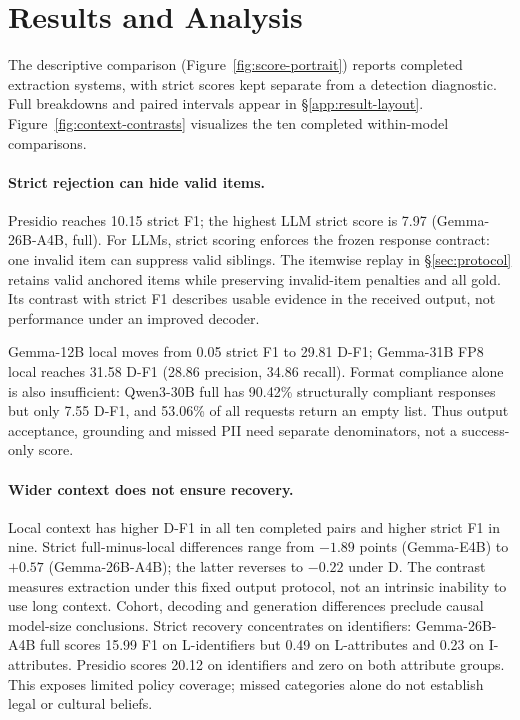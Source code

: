\section{Results and Analysis}
\label{sec:results}

The descriptive comparison (Figure~\ref{fig:score-portrait}) reports completed extraction systems, with strict scores kept separate from a detection diagnostic. Full breakdowns and paired intervals appear in \S\ref{app:result-layout}. Figure~\ref{fig:context-contrasts} visualizes the ten completed within-model comparisons.



\paragraph{Strict rejection can hide valid items.}
Presidio reaches 10.15 strict F1; the highest LLM strict score is 7.97 (Gemma-26B-A4B, full). For LLMs, strict scoring enforces the frozen response contract: one invalid item can suppress valid siblings. The itemwise replay in \S\ref{sec:protocol} retains valid anchored items while preserving invalid-item penalties and all gold. Its contrast with strict F1 describes usable evidence in the received output, not performance under an improved decoder.

Gemma-12B local moves from 0.05 strict F1 to 29.81 D-F1; Gemma-31B FP8 local reaches 31.58 D-F1 (28.86 precision, 34.86 recall). Format compliance alone is also insufficient: Qwen3-30B full has 90.42\% structurally compliant responses but only 7.55 D-F1, and 53.06\% of all requests return an empty list. Thus output acceptance, grounding and missed PII need separate denominators, not a success-only score.

\paragraph{Wider context does not ensure recovery.}
Local context has higher D-F1 in all ten completed pairs and higher strict F1 in nine. Strict full-minus-local differences range from $-1.89$ points (Gemma-E4B) to $+0.57$ (Gemma-26B-A4B); the latter reverses to $-0.22$ under D. The contrast measures extraction under this fixed output protocol, not an intrinsic inability to use long context. Cohort, decoding and generation differences preclude causal model-size conclusions. Strict recovery concentrates on identifiers: Gemma-26B-A4B full scores 15.99 F1 on L-identifiers but 0.49 on L-attributes and 0.23 on I-attributes. Presidio scores 20.12 on identifiers and zero on both attribute groups. This exposes limited policy coverage; missed categories alone do not establish legal or cultural beliefs.



